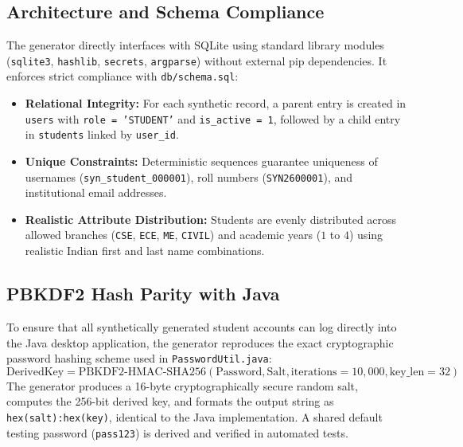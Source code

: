 \subsection{Architecture and Schema Compliance}
The generator directly interfaces with SQLite using standard library modules (\texttt{sqlite3}, \texttt{hashlib}, \texttt{secrets}, \texttt{argparse}) without external pip dependencies. It enforces strict compliance with \texttt{db/schema.sql}:
\begin{itemize}
    \item \textbf{Relational Integrity:} For each synthetic record, a parent entry is created in \texttt{users} with \texttt{role = 'STUDENT'} and \texttt{is\_active = 1}, followed by a child entry in \texttt{students} linked by \texttt{user\_id}.
    \item \textbf{Unique Constraints:} Deterministic sequences guarantee uniqueness of usernames (\texttt{syn\_student\_000001}), roll numbers (\texttt{SYN2600001}), and institutional email addresses.
    \item \textbf{Realistic Attribute Distribution:} Students are evenly distributed across allowed branches (\texttt{CSE}, \texttt{ECE}, \texttt{ME}, \texttt{CIVIL}) and academic years ($1$ to $4$) using realistic Indian first and last name combinations.
\end{itemize}

\subsection{PBKDF2 Hash Parity with Java}
To ensure that all synthetically generated student accounts can log directly into the Java desktop application, the generator reproduces the exact cryptographic password hashing scheme used in \texttt{PasswordUtil.java}:
\begin{equation}
    \text{DerivedKey} = \text{PBKDF2-HMAC-SHA256}(\text{Password}, \text{Salt}, \text{iterations}=10{,}000, \text{key\_len}=32)
\end{equation}
The generator produces a 16-byte cryptographically secure random salt, computes the 256-bit derived key, and formats the output string as \texttt{hex(salt):hex(key)}, identical to the Java implementation. A shared default testing password (\texttt{pass123}) is derived and verified in automated tests.

